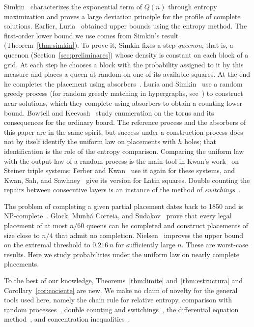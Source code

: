 Simkin~\cite{Simkin} characterizes the exponential term of $Q(n)$ through entropy maximization and proves a
large deviation principle
for the profile of complete solutions. Earlier, Luria~\cite{Luria} obtained upper bounds using the entropy
method. The first-order
lower bound we use comes from Simkin's result (Theorem~\ref{thm:simkin}). To prove it, Simkin fixes a step
\emph{queenon}, that is, a
queenon (Section~\ref{sec:preliminares}) whose density is constant on each block of a grid. At each step he
chooses a block with the
probability assigned to it by this measure and places a queen at random on one of its available squares. At
the end he
completes the placement using absorbers~\cite[Section~5]{Simkin}. Luria and Simkin~\cite{LS} use a random
greedy process (for random greedy matching in hypergraphs, see~\cite{BennettBohman}) to construct
near-solutions, which they complete using absorbers to obtain a counting lower bound. Bowtell and
Keevash~\cite{BK} study enumeration
on the torus and its consequences for the ordinary board. The reference process and the absorbers of this
paper are in the same spirit, but
success under a construction process does not by itself identify the uniform law on placements with $h$
holes; that identification
is the role of the entropy comparison. Comparing the uniform law with the output law of a random process is
the main tool in Kwan's
work~\cite{Kwan} on Steiner triple systems; Ferber and Kwan~\cite{FerberKwan} use it again for
these systems, and Kwan, Sah, and Sawhney~\cite{KSS} give its version for Latin squares.
Double counting the repairs between consecutive layers is an
instance of the method of
\emph{switchings}~\cite{McKayWormald,HMcK}.

The problem of completing a given partial placement dates back to 1850 and is NP-complete~\cite{GJN}. Glock,
Munhá Correia, and
Sudakov~\cite{GMS} prove that every legal placement of at most $n/60$ queens can be completed and construct
placements of size close to
$n/4$ that admit no completion. Nielsen~\cite{Nielsen} improves the upper bound on the extremal threshold to
$0.216\,n$ for
sufficiently large $n$. These are worst-case results. Here we study probabilities under the uniform law on
nearly complete placements.

To the best of our knowledge, Theorems~\ref{thm:limite} and~\ref{thm:estructura} and
Corollary~\ref{cor:cociente} are new. We make no claim of novelty for the general tools used here, namely
the chain rule for relative
entropy, comparison with random processes~\cite{Kwan}, double counting and switchings~\cite{HMcK}, the
differential equation
method~\cite{Wormald,Warnke,BennettDudek}, and concentration inequalities~\cite{AlonSpencer}.
